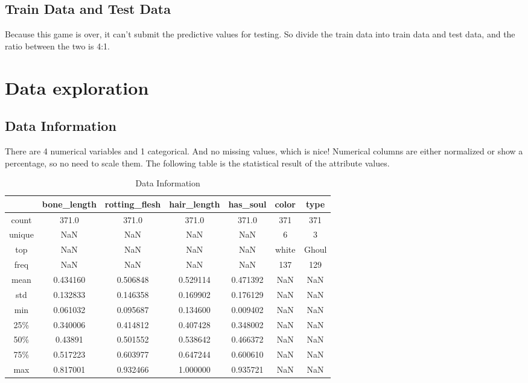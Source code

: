 \subsection{Train Data and Test Data}
Because this game is over, it can't submit the predictive values for testing. So divide the train data into train data and test data, and the ratio between the two is 4:1.

\section{Data exploration} \label{sec-data_exploration}

\subsection{Data Information}
There are 4 numerical variables and 1 categorical. And no missing values, which is nice! Numerical columns are either normalized or show a percentage, so no need to scale them. The following table is the statistical result of the attribute values.


\begin{table}[h]  \centering
	\caption{Data Information}
	\label{tbl:data information}
	\begin{tabular}{ccccccc}
		\hline
		& bone_length & rotting_flesh & hair_length & has_soul & color & type\\
		\hline
		count & 371.0 & 371.0 & 371.0 & 371.0 & 371 & 371 \\
		unique & NaN & NaN & NaN & NaN & 6 & 3 \\
		top & NaN & NaN & NaN & NaN & white & Ghoul \\
		freq & NaN & NaN & NaN & NaN & 137 & 129\\
		mean & 0.434160 & 0.506848 & 0.529114 & 0.471392 & NaN & NaN \\
		std & 0.132833 & 0.146358 & 0.169902 & 0.176129 & NaN & NaN \\
		min & 0.061032 & 0.095687 & 0.134600 & 0.009402 & NaN & NaN \\
		25\% & 0.340006 & 0.414812 & 0.407428 & 0.348002 & NaN & NaN \\
		50\% & 0.43891 & 0.501552 & 0.538642 & 0.466372 & NaN & NaN\\
		75\% & 0.517223 & 0.603977 & 0.647244 & 0.600610 & NaN & NaN\\
		max &  0.817001 & 0.932466 & 1.000000 & 0.935721 & NaN & NaN\\
		\hline 
	\end{tabular}
\end{table}


